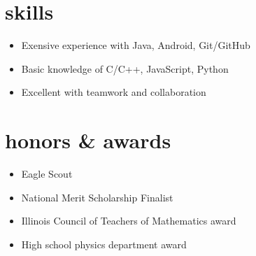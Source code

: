 \documentclass[print]{resume} %
\begin{document}

\section{skills}

\begin{itemize}
\setlength{\itemsep}{-5pt}
\item Exensive experience with Java, Android, Git/GitHub
\item Basic knowledge of C/C++, JavaScript, Python
\item Excellent with teamwork and collaboration
\end{itemize}



\section{honors \& awards}

\begin{itemize}
\setlength{\itemsep}{-5pt}
\item Eagle Scout
\item National Merit Scholarship Finalist
\item Illinois Council of Teachers of Mathematics award
\item High school physics department award
\end{itemize}
\end{document}
